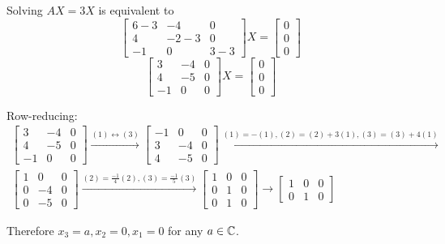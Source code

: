 \documentclass[a4paper, 11pt]{article}
\begin{document}
\begin{solution}
    Solving \(AX = 3X\) is equivalent to \[
        \left[\begin{array}{ccc}
                6 -3 & -4    & 0    \\
                4    & -2 -3 & 0    \\
                -1   & 0     & 3 -3
            \end{array}\right] X = \left[\begin{array}{c}
                0 \\ 0 \\ 0
            \end{array}\right]
    \]
    \[
        \left[\begin{array}{ccc}
                3  & -4 & 0 \\
                4  & -5 & 0 \\
                -1 & 0  & 0
            \end{array}\right] X = \left[\begin{array}{c}
                0 \\ 0 \\ 0
            \end{array}\right]
    \]

    Row-reducing:
    \begin{multline*}
        \left[\begin{array}{ccc}
                3  & -4 & 0 \\
                4  & -5 & 0 \\
                -1 & 0  & 0
            \end{array}\right] \xrightarrow{(1) \leftrightarrow (3)}
        \left[\begin{array}{ccc}
                -1 & 0  & 0 \\
                3  & -4 & 0 \\
                4  & -5 & 0
            \end{array}\right] \xrightarrow{(1) = -(1), (2) = (2) + 3(1), (3) = (3) + 4(1)}
        \\
        \left[\begin{array}{ccc}
                1 & 0  & 0 \\
                0 & -4 & 0 \\
                0 & -5 & 0
            \end{array}\right] \xrightarrow{(2) = \frac{-1}{4}(2), (3) = \frac{-1}{5}(3)}
        \left[\begin{array}{ccc}
                1 & 0 & 0 \\
                0 & 1 & 0 \\
                0 & 1 & 0
            \end{array}\right] \xrightarrow{}
        \left[\begin{array}{ccc}
        1 & 0 & 0 \\
        0 & 1 & 0 
        \end{array}\right]
    \end{multline*}

    Therefore \(x_3 = a, x_2 = 0, x_1 = 0\) for any \(a \in \mathbb{C}\).
\end{solution}
\end{document}
